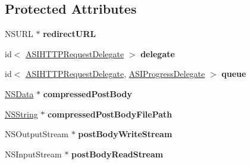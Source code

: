 \subsection*{\-Protected \-Attributes}
\begin{DoxyCompactItemize}
\item 
\hypertarget{interface_a_s_i_h_t_t_p_request_a3000b9287091694f2bd37ddc84ff294a}{
\-N\-S\-U\-R\-L $\ast$ {\bfseries redirect\-U\-R\-L}}
\label{interface_a_s_i_h_t_t_p_request_a3000b9287091694f2bd37ddc84ff294a}

\item 
\hypertarget{interface_a_s_i_h_t_t_p_request_a30d0215dccb74fddfd8f5089a636d830}{
id$<$ \hyperlink{protocol_a_s_i_h_t_t_p_request_delegate-p}{\-A\-S\-I\-H\-T\-T\-P\-Request\-Delegate} $>$ {\bfseries delegate}}
\label{interface_a_s_i_h_t_t_p_request_a30d0215dccb74fddfd8f5089a636d830}

\item 
\hypertarget{interface_a_s_i_h_t_t_p_request_a6b5f3b749684e3ae79381fee6d0742ab}{
id$<$ \hyperlink{protocol_a_s_i_h_t_t_p_request_delegate-p}{\-A\-S\-I\-H\-T\-T\-P\-Request\-Delegate}, \*
\hyperlink{protocol_a_s_i_progress_delegate-p}{\-A\-S\-I\-Progress\-Delegate} $>$ {\bfseries queue}}
\label{interface_a_s_i_h_t_t_p_request_a6b5f3b749684e3ae79381fee6d0742ab}

\item 
\hypertarget{interface_a_s_i_h_t_t_p_request_a86c517b3a7c2020d30d9956b96792931}{
\hyperlink{class_n_s_data}{\-N\-S\-Data} $\ast$ {\bfseries compressed\-Post\-Body}}
\label{interface_a_s_i_h_t_t_p_request_a86c517b3a7c2020d30d9956b96792931}

\item 
\hypertarget{interface_a_s_i_h_t_t_p_request_a5b6b9cb55b82b39bfd7fb65b5e58ef45}{
\hyperlink{class_n_s_string}{\-N\-S\-String} $\ast$ {\bfseries compressed\-Post\-Body\-File\-Path}}
\label{interface_a_s_i_h_t_t_p_request_a5b6b9cb55b82b39bfd7fb65b5e58ef45}

\item 
\hypertarget{interface_a_s_i_h_t_t_p_request_a6442b757ad5f74bdcf9970f3bbfca13c}{
\-N\-S\-Output\-Stream $\ast$ {\bfseries post\-Body\-Write\-Stream}}
\label{interface_a_s_i_h_t_t_p_request_a6442b757ad5f74bdcf9970f3bbfca13c}

\item 
\hypertarget{interface_a_s_i_h_t_t_p_request_a3fa2c1edf293d050400f23167b165066}{
\-N\-S\-Input\-Stream $\ast$ {\bfseries post\-Body\-Read\-Stream}}
\label{interface_a_s_i_h_t_t_p_request_a3fa2c1edf293d050400f23167b165066}


\end{DoxyCompactItemize}
